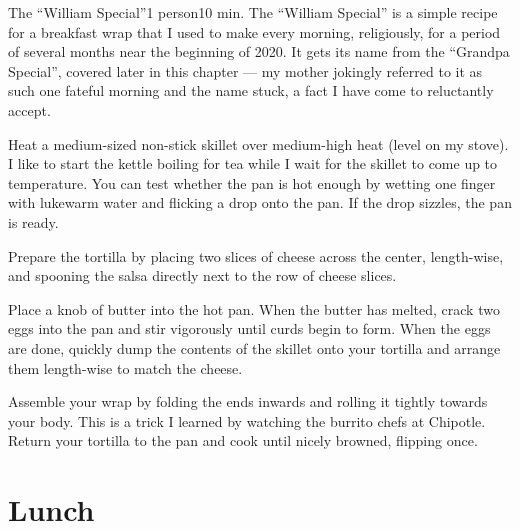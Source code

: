 \begin{recipe}{The \enquote{William Special}}{1 person}{10 min.}
\freeform The \enquote{William Special} is a simple recipe for a breakfast wrap
that I used to make every morning, religiously, for a period of several months
near the beginning of 2020. It gets its name from the \enquote{Grandpa Special},
covered later in this chapter --- my mother jokingly referred to it as such one
fateful morning and the name stuck, a fact I have come to reluctantly accept.

\newstep Heat a medium-sized non-stick skillet over medium-high heat (level
 on my stove).  I like to start the kettle boiling for tea while
I wait for the skillet to come up to temperature. You can test whether the pan
is hot enough by wetting one finger with lukewarm water and flicking a drop onto
the pan. If the drop sizzles, the pan is ready.

Prepare the tortilla by placing two slices of cheese across the center,
length-wise, and spooning the salsa directly next to the row of cheese
slices.

Place a knob of butter into the hot pan. When the butter has melted, crack
two eggs into the pan and stir vigorously until curds begin to form. When the
eggs are done, quickly dump the contents of the skillet onto your tortilla
and arrange them length-wise to match the cheese.

\newstep Assemble your wrap by folding the ends inwards and rolling
it tightly towards your body. This is a trick I learned by watching the
burrito chefs at Chipotle\texttrademark. Return your tortilla to the pan
and cook until nicely browned, flipping once.
\end{recipe}

\section{Lunch}
\label{sec:findlay-lunch}

